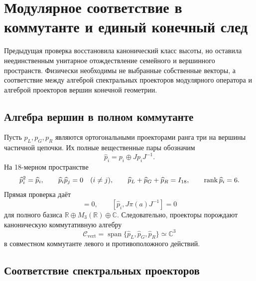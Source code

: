 \chapter{Модулярное соответствие в коммутанте и единый конечный след}

Предыдущая проверка восстановила канонический класс высоты, но оставила
неединственным унитарное отождествление семейного и вершинного пространств.
Физически необходимы не выбранные собственные векторы, а соответствие между
алгеброй спектральных проекторов модулярного оператора и алгеброй проекторов
вершин конечной геометрии.

\section{Алгебра вершин в полном коммутанте}

Пусть \(p_L,p_G,p_R\) являются ортогональными проекторами ранга три на
вершины частичной цепочки. Их полные вещественные пары обозначим
\begin{equation}
 \widehat p_i=p_i\oplus Jp_iJ^{-1}.
\end{equation}
На 18-мерном пространстве
\begin{equation}
 \widehat p_i^2=\widehat p_i,
 \qquad \widehat p_i\widehat p_j=0\quad(i\ne j),
 \qquad \widehat p_L+\widehat p_G+\widehat p_R=I_{18},
 \qquad \operatorname{rank}\widehat p_i=6.
 \label{eq:v5-commutant-vertex-projectors}
\end{equation}
Прямая проверка даёт
\begin{equation}
 [\widehat p_i,\pi(a)]=0,
 \qquad
 [\widehat p_i,J\pi(a)J^{-1}]=0
 \label{eq:v5-commutant-double-commutant}
\end{equation}
для полного базиса
\(\mathbb R\oplus M_3(\mathbb R)\oplus\mathbb C\).
Следовательно, проекторы порождают каноническую коммутативную алгебру
\begin{equation}
 \mathcal C_{\mathrm{vert}}
 =\operatorname{span}\{\widehat p_L,\widehat p_G,\widehat p_R\}
 \simeq\mathbb C^3
\end{equation}
в совместном коммутанте левого и противоположного действий.

\section{Соответствие спектральных проекторов}

